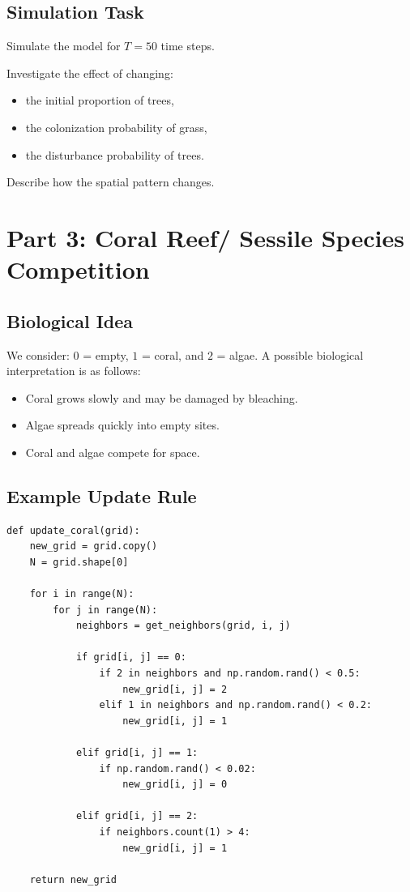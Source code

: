\documentclass[paper=letter, fontsize=12pt]{article}
\numberwithin{equation}{section}
\begin{document}
\subsection*{Simulation Task}

Simulate the model for $T=50$ time steps.

\begin{taskbox}
Investigate the effect of changing:
\begin{itemize}
\item the initial proportion of trees,
\item the colonization probability of grass,
\item the disturbance probability of trees.
\end{itemize}
Describe how the spatial pattern changes.
\end{taskbox}

\section*{Part 3: Coral Reef/ Sessile Species Competition}

\subsection*{Biological Idea}
We consider: $0$ = empty, $1$ = coral, and $2$ = algae. A possible biological interpretation is as follows:
\begin{itemize}
\item Coral grows slowly and may be damaged by bleaching.
\item Algae spreads quickly into empty sites.
\item Coral and algae compete for space.
\end{itemize}

\subsection*{Example Update Rule}

\begin{lstlisting}
def update_coral(grid):
    new_grid = grid.copy()
    N = grid.shape[0]

    for i in range(N):
        for j in range(N):
            neighbors = get_neighbors(grid, i, j)

            if grid[i, j] == 0:
                if 2 in neighbors and np.random.rand() < 0.5:
                    new_grid[i, j] = 2
                elif 1 in neighbors and np.random.rand() < 0.2:
                    new_grid[i, j] = 1

            elif grid[i, j] == 1:
                if np.random.rand() < 0.02:
                    new_grid[i, j] = 0

            elif grid[i, j] == 2:
                if neighbors.count(1) > 4:
                    new_grid[i, j] = 1

    return new_grid
\end{lstlisting}
\end{document}
